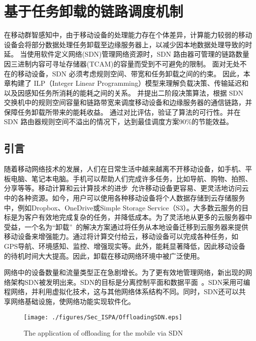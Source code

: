 \chapter{基于任务卸载的链路调度机制}

在移动群智感知中，由于移动设备的处理能力存在个体差异，计算能力较弱的移动设备会将部分数据处理任务卸载至边缘服务器上，以减少因本地数据处理导致的时延。
当使用软件定义网络(SDN)管理网络资源时，SDN 路由器可管理的链路数量因三进制内容可寻址存储器(TCAM)的容量而受到不可避免的限制。
面对无处不在的移动设备，SDN 必须考虑规则空间、带宽和任务卸载之间的约束。
因此，本章构建了 ILP（Integer Linear Programming）模型来理解负载决策、传输延迟和以及因感知任务所消耗的能耗之间的关系。
并提出二阶段决策算法，根据 SDN 交换机中的规则空间容量和链路带宽来调度移动设备和边缘服务器的通信链路，并保障任务卸载所带来的能耗收益。
通过对比评估，验证了算法的可行性。并在 SDN 路由器规则空间不溢出的情况下，达到最佳调度方案90\%的节能效益。

\section{引言}

随着移动网络技术的发展，人们在日常生活中越来越离不开移动设备，如手机、平板电脑、笔记本电脑。手机可以帮助人们完成许多任务，比如导航、购物、拍照、分享等等。移动计算和云计算技术的进步~\cite{Lee:2013fj, Linthicum:2017vv}允许移动设备更容易、更灵活地访问云中的各种资源。如今，用户可以使用各种移动设备将个人数据存储到云存储服务中，例如Dropbox、OneDrive或Simple Storage Service（S3）。大多数云服务的目标是为客户有效地完成复杂的任务，并降低成本。为了灵活地从更多的云服务器中受益，一个名为“卸载”~\cite{Kumar:2013dq}的解决方案通过将任务从本地设备迁移到云服务器来提供移动设备来增强能力。通过将计算交付给云，移动设备可以完成各种任务，如GPS导航、环境感知、监控、增强现实等。此外，能耗显著降低，因此移动设备的待机时间大大提高。因此，卸载在移动网络环境中被广泛使用。

网络中的设备数量和流量类型正在急剧增长。为了更有效地管理网络，新出现的网络架构SDN被发明出来。SDN的目标是分离控制平面和数据平面~\cite{Committee:2012un}。SDN采用可编程网络，并利用虚拟化技术，这与其他网络体系结构不同。同时，SDN还可以共享网络基础设施，使网络功能实现软件化。

\begin{figure}[!h]
  \centering
  \texttt{[image: ./figures/Sec\_ISPA/OffloadingSDN.eps]}
  \vspace{-1em}
  \caption{The application of offloading for the mobile via SDN}
  \vspace{-1em}
  \label{fig_OffloadingSDN}
\end{figure}

